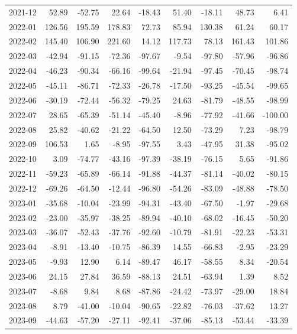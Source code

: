 \begin{table}[ht]
\begin{tabular}{lrrrrrrrr}
  2021-12 & 52.89 & -52.75 & 22.64 & -18.43 & 51.40 & -18.11 & 48.73 & 6.41 \\ 
  2022-01 & 126.56 & 195.59 & 178.83 & 72.73 & 85.94 & 130.38 & 61.24 & 60.17 \\ 
  2022-02 & 145.40 & 106.90 & 221.60 & 14.12 & 117.73 & 78.13 & 161.43 & 101.86 \\ 
  2022-03 & -42.94 & -91.15 & -72.36 & -97.67 & -9.54 & -97.80 & -57.96 & -96.86 \\ 
  2022-04 & -46.23 & -90.34 & -66.16 & -99.64 & -21.94 & -97.45 & -70.45 & -98.74 \\ 
  2022-05 & -45.11 & -86.71 & -72.33 & -26.78 & -17.50 & -93.25 & -45.54 & -99.65 \\ 
  2022-06 & -30.19 & -72.44 & -56.32 & -79.25 & 24.63 & -81.79 & -48.55 & -98.99 \\ 
  2022-07 & 28.65 & -65.39 & -51.14 & -45.40 & -8.96 & -77.92 & -41.66 & -100.00 \\ 
  2022-08 & 25.82 & -40.62 & -21.22 & -64.50 & 12.50 & -73.29 & 7.23 & -98.79 \\ 
  2022-09 & 106.53 & 1.65 & -8.95 & -97.55 & 3.43 & -47.95 & 31.38 & -95.02 \\ 
  2022-10 & 3.09 & -74.77 & -43.16 & -97.39 & -38.19 & -76.15 & 5.65 & -91.86 \\ 
  2022-11 & -59.23 & -65.89 & -66.14 & -91.88 & -44.37 & -81.14 & -40.02 & -80.15 \\ 
  2022-12 & -69.26 & -64.50 & -12.44 & -96.80 & -54.26 & -83.09 & -48.88 & -78.50 \\ 
  2023-01 & -35.68 & -10.04 & -23.99 & -94.31 & -43.40 & -67.50 & -1.97 & -29.68 \\ 
  2023-02 & -23.00 & -35.97 & -38.25 & -89.94 & -40.10 & -68.02 & -16.45 & -50.20 \\ 
  2023-03 & -36.07 & -52.43 & -37.76 & -92.60 & -10.79 & -81.91 & -22.23 & -53.31 \\ 
  2023-04 & -8.91 & -13.40 & -10.75 & -86.39 & 14.55 & -66.83 & -2.95 & -23.29 \\ 
  2023-05 & -9.93 & 12.90 & 6.14 & -89.47 & 46.17 & -58.55 & 8.34 & -20.54 \\ 
  2023-06 & 24.15 & 27.84 & 36.59 & -88.13 & 24.51 & -63.94 & 1.39 & 8.52 \\ 
  2023-07 & -8.68 & 9.84 & 8.68 & -87.86 & -24.42 & -73.97 & -29.00 & 18.84 \\ 
  2023-08 & 8.79 & -41.00 & -10.04 & -90.65 & -22.82 & -76.03 & -37.62 & 13.27 \\ 
  2023-09 & -44.63 & -57.20 & -27.11 & -92.41 & -37.06 & -85.13 & -53.44 & -33.39 \\ 

\end{tabular}
\end{table}
